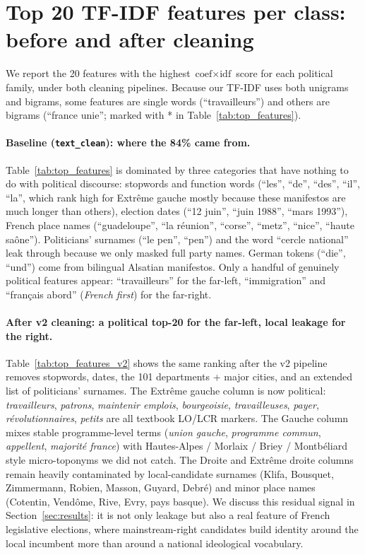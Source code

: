 \documentclass{article}
\begin{document}
\newpage
\section{Top 20 TF-IDF features per class: before and after cleaning}
\label{app:features}

We report the 20 features with the highest $\text{coef} \times \text{idf}$ score for each political family, under both cleaning pipelines. Because our TF-IDF uses both unigrams and bigrams, some features are single words (``travailleurs'') and others are bigrams (``france unie''; marked with * in Table~\ref{tab:top_features}).

\paragraph{Baseline (\texttt{text\_clean}): where the 84\% came from.} Table~\ref{tab:top_features} is dominated by three categories that have nothing to do with political discourse: stopwords and function words (``les'', ``de'', ``des'', ``il'', ``la'', which rank high for Extr\^{e}me gauche mostly because these manifestos are much longer than others), election dates (``12 juin'', ``juin 1988'', ``mars 1993''), French place names (``guadeloupe'', ``la r\'{e}union'', ``corse'', ``metz'', ``nice'', ``haute sa\^{o}ne''). Politicians' surnames (``le pen'', ``pen'') and the word ``cercle national'' leak through because we only masked full party names. German tokens (``die'', ``und'') come from bilingual Alsatian manifestos. Only a handful of genuinely political features appear: ``travailleurs'' for the far-left, ``immigration'' and ``fran\c{c}ais abord'' (\textit{French first}) for the far-right.

\paragraph{After v2 cleaning: a political top-20 for the far-left, local leakage for the right.} Table~\ref{tab:top_features_v2} shows the same ranking after the v2 pipeline removes stopwords, dates, the 101 departments + major cities, and an extended list of politicians' surnames. The Extr\^{e}me gauche column is now political: \textit{travailleurs}, \textit{patrons}, \textit{maintenir emplois}, \textit{bourgeoisie}, \textit{travailleuses}, \textit{payer}, \textit{r\'{e}volutionnaires}, \textit{petits} are all textbook LO/LCR markers. The Gauche column mixes stable programme-level terms (\textit{union gauche}, \textit{programme commun}, \textit{appellent}, \textit{majorit\'{e} france}) with Hautes-Alpes / Morlaix / Briey / Montb\'{e}liard style micro-toponyms we did not catch. The Droite and Extr\^{e}me droite columns remain heavily contaminated by local-candidate surnames (Klifa, Bousquet, Zimmermann, Robien, Masson, Guyard, Debr\'{e}) and minor place names (Cotentin, Vend\^{o}me, Rive, Evry, pays basque). We discuss this residual signal in Section~\ref{sec:results}: it is not only leakage but also a real feature of French legislative elections, where mainstream-right candidates build identity around the local incumbent more than around a national ideological vocabulary.
\end{document}
